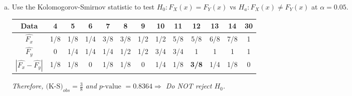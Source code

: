 \documentclass[12pt]{article}
\begin{document}
\begin{enumerate}[(a)]
\item Use the Kolomogorov-Smirnov statistic to test $H_0: F_X(x) = F_Y(x)$ vs $H_a: F_X(x) \neq F_Y(x)$ at $\alpha=0.05$.
\begin{table}[H] \center
\begin{tabular}{|c|c|c|c|c|c|c|c|c|c|c|c|c|} \hline
Data&4&5 &6& 7& 8& 9 &10& 11 &12&13&14&30\\ \hline
$\hat{F_x}$&1/8&1/8&1/4&3/8& 3/8&1/2&1/2&5/8&5/8&6/8&7/8&1\\ \hline
$\hat{F_y}$&0&1/4&1/4&1/4& 1/2&1/2&3/4&3/4&1&1&1&1\\ \hline
$|\hat{F_x}-\hat{F_y}|$ &1/8&1/8&0&1/8&1/8&0&1/4&1/8&\textbf{3/8}&1/4&1/8&0\\ \hline
\end{tabular}
\end{table}
\emph{ Therefore, $\text{(K-S)}_{obs}=\frac{3}{8}$ and $p\text{-value } = 0.8364 \Rightarrow$ Do NOT reject $H_0$. }
\end{enumerate}

\newpage
\end{document}
